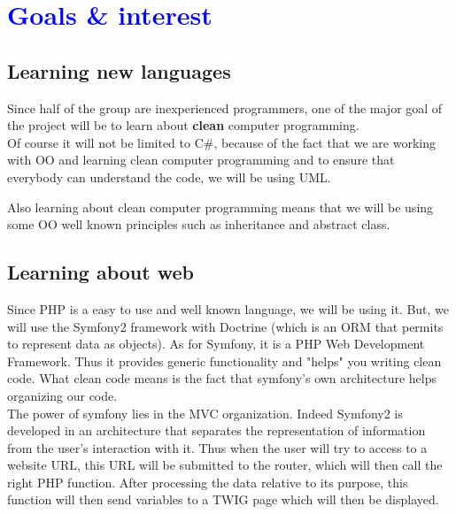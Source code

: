 \documentclass[article]{report} %
\begin{document}
				\chapter{\textcolor{blue}{Goals \& interest}}
						\section{Learning new languages}
								Since half of the group are inexperienced programmers, one of the major goal of the project will be to learn about \textbf{clean} computer programming.\\
								
								Of course it will not be limited to C\#, because of the fact that we are working with \ac{OO} and learning clean computer programming and to ensure that everybody can understand the code, we will be using \ac{UML}.\newline
																							
								Also learning about clean computer programming means that we will be using some \ac{OO} well known principles such as inheritance and abstract class.
							  
						\section{Learning about web}
							  		Since \ac{PHP} is a easy to use and well known language, we will be using it. But, we will use the Symfony2 framework with Doctrine (which is an \ac{ORM} that permits to represent data as objects).\newline 
							  		As for Symfony, it is a \ac{PHP} Web Development Framework. Thus it provides generic functionality and "helps" you writing clean code. \newline
What clean code means is the fact that symfony\textquoteright s own architecture helps organizing our code.\\
							  		
							  		The power of symfony lies in the \ac{MVC} organization. Indeed Symfony2 is developed in an architecture that separates the representation of information from the user\textquoteright s interaction with it.\newline
							  		 Thus when the user will try to access to a website URL, this URL will be submitted to the router, which will then call the right PHP function. After processing the data relative to its purpose, this function will then send variables to a TWIG page which will then be displayed.
							  		 
\end{document}
